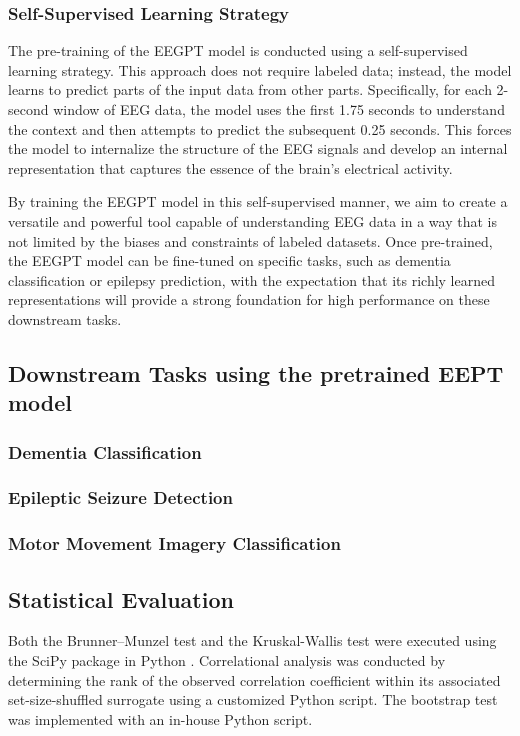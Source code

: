 \documentclass[final,3p,times,twocolumn]{elsarticle}
\begin{document}
\subsubsection{Self-Supervised Learning Strategy}
The pre-training of the EEGPT model is conducted using a self-supervised learning strategy. This approach does not require labeled data; instead, the model learns to predict parts of the input data from other parts. Specifically, for each 2-second window of EEG data, the model uses the first 1.75 seconds to understand the context and then attempts to predict the subsequent 0.25 seconds. This forces the model to internalize the structure of the EEG signals and develop an internal representation that captures the essence of the brain's electrical activity.

By training the EEGPT model in this self-supervised manner, we aim to create a versatile and powerful tool capable of understanding EEG data in a way that is not limited by the biases and constraints of labeled datasets. Once pre-trained, the EEGPT model can be fine-tuned on specific tasks, such as dementia classification or epilepsy prediction, with the expectation that its richly learned representations will provide a strong foundation for high performance on these downstream tasks.

\subsection{Downstream Tasks using the pretrained EEPT model}
\subsubsection{Dementia Classification}

\subsubsection{Epileptic Seizure Detection}
\subsubsection{Motor Movement Imagery Classification}

\subsection{Statistical Evaluation}
Both the Brunner--Munzel test and the Kruskal-Wallis test were executed using the SciPy package in Python \cite{virtanen_scipy_2020}. Correlational analysis was conducted by determining the rank of the observed correlation coefficient within its associated set-size-shuffled surrogate using a customized Python script. The bootstrap test was implemented with an in-house Python script.
\label{sec:methods}
\end{document}
